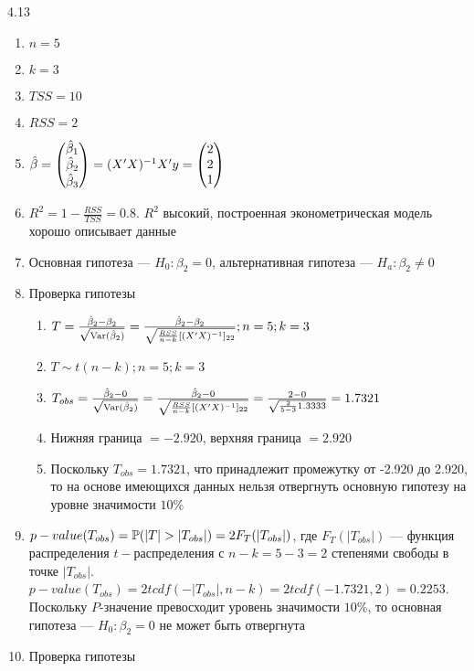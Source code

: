 \protect \hypertarget {soln:4.13}{}
\begin{solution}{{4.13}}
\begin{enumerate}
\item $n = 5$
\item $k = 3$
\item $TSS = 10$
\item $RSS = 2$
\item $\hat{\beta} = \begin{pmatrix} \hat{\beta}_1 \\ \hat{\beta}_2 \\ \hat{\beta}_3 \end{pmatrix} = (X'X)^{-1}X'y = \begin{pmatrix} 2 \\ 2 \\ 1 \end{pmatrix}$
\item $R^2 = 1 - \frac {RSS}{TSS} = 0.8.$ $R^2$ высокий, построенная эконометрическая модель хорошо описывает данные
\item Основная гипотеза — $H_0: \beta_2 = 0$, альтернативная гипотеза — $H_a: \beta_2 \not= 0$
\item Проверка гипотезы
\begin{enumerate}
\item $T = \frac{\hat{\beta}_2 - \beta_2}{\sqrt{\operatorname{Var}(\hat{\beta}_2)}} = \frac {\hat{\beta}_2 - \beta_2}{\sqrt{{\frac{RSS}{n-k}}[(X'X)^{-1}]_{22}}}; n = 5; k = 3$
\item $T \sim t(n-k); n = 5; k = 3$
\item $T_{obs} = \frac{\hat{\beta}_2 - 0}{\sqrt{\operatorname{Var}(\hat{\beta}_2)}} = \frac {\hat{\beta}_2 - 0}{\sqrt{{\frac{RSS}{n-k}}[(X'X)^{-1}]_{22}}} = \frac{2-0}{\sqrt{{\frac{2}{5-3}}1.3333}} = 1.7321$
\item Нижняя граница $= -2.920$, верхняя граница $= 2.920$
\item Поскольку $T_{obs} = 1.7321$, что принадлежит промежутку от -2.920 до 2.920, то на основе имеющихся данных нельзя отвергнуть основную гипотезу на уровне значимости $10\%$
\end{enumerate}
\item $p-value(T_{obs}) = \P (|T|>|T_{obs}|) = 2F_{T}(|T_{obs}|)$, где $F_{T}(|T_{obs}|)$ — функция распределения $t-$распределения с $n - k = 5 - 3 = 2$ степенями свободы в точке $|T_{obs}|$. $p-value(T_{obs}) = 2tcdf(-|T_{obs}|, n - k) = 2tcdf(-1.7321,2) = 0.2253$. Поскольку $P$-значение превосходит уровень значимости $10\%$, то основная гипотеза — $H_0: \beta_2 = 0$ не может быть отвергнута
\item Проверка гипотезы

\end{enumerate}
\end{solution}
